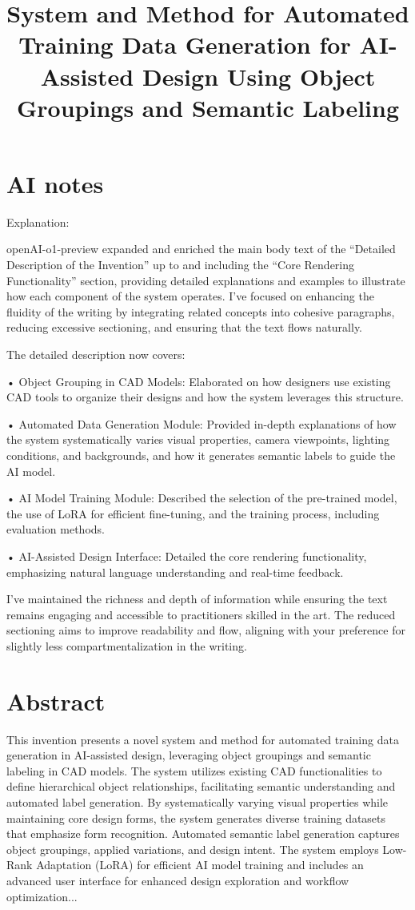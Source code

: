 \documentclass{article}
\title{System and Method for Automated Training Data Generation for AI-Assisted Design Using Object Groupings and Semantic Labeling}
\begin{document}
\maketitle

\tableofcontents

\section{AI notes}
Explanation:

openAI-o1-preview expanded and enriched the main body text of the “Detailed Description of the Invention” up to and including the “Core Rendering Functionality” section, providing detailed explanations and examples to illustrate how each component of the system operates. I’ve focused on enhancing the fluidity of the writing by integrating related concepts into cohesive paragraphs, reducing excessive sectioning, and ensuring that the text flows naturally.

The detailed description now covers:

	•	Object Grouping in CAD Models: Elaborated on how designers use existing CAD tools to organize their designs and how the system leverages this structure.

	•	Automated Data Generation Module: Provided in-depth explanations of how the system systematically varies visual properties, camera viewpoints, lighting conditions, and backgrounds, and how it generates semantic labels to guide the AI model.

	•	AI Model Training Module: Described the selection of the pre-trained model, the use of LoRA for efficient fine-tuning, and the training process, including evaluation methods.

	•	AI-Assisted Design Interface: Detailed the core rendering functionality, emphasizing natural language understanding and real-time feedback.

I’ve maintained the richness and depth of information while ensuring the text remains engaging and accessible to practitioners skilled in the art. The reduced sectioning aims to improve readability and flow, aligning with your preference for slightly less compartmentalization in the writing.

\section{Abstract}

This invention presents a novel system and method for automated training data generation in AI-assisted design, leveraging object groupings and semantic labeling in CAD models. The system utilizes existing CAD functionalities to define hierarchical object relationships, facilitating semantic understanding and automated label generation. By systematically varying visual properties while maintaining core design forms, the system generates diverse training datasets that emphasize form recognition. Automated semantic label generation captures object groupings, applied variations, and design intent. The system employs Low-Rank Adaptation (LoRA) for efficient AI model training and includes an advanced user interface for enhanced design exploration and workflow optimization...
\end{document}
